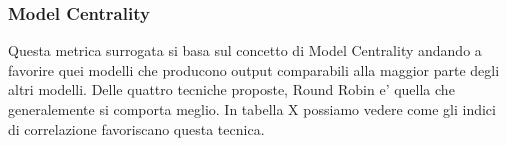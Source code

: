 \subsubsection{Model Centrality}
Questa metrica surrogata si basa sul concetto di Model Centrality andando a favorire quei modelli che producono output comparabili alla maggior parte degli altri modelli. Delle quattro tecniche proposte, Round Robin e' quella che generalemente si comporta meglio. In tabella X possiamo vedere come gli indici di correlazione favoriscano questa tecnica.
\begin{table}[]
\end{table}
